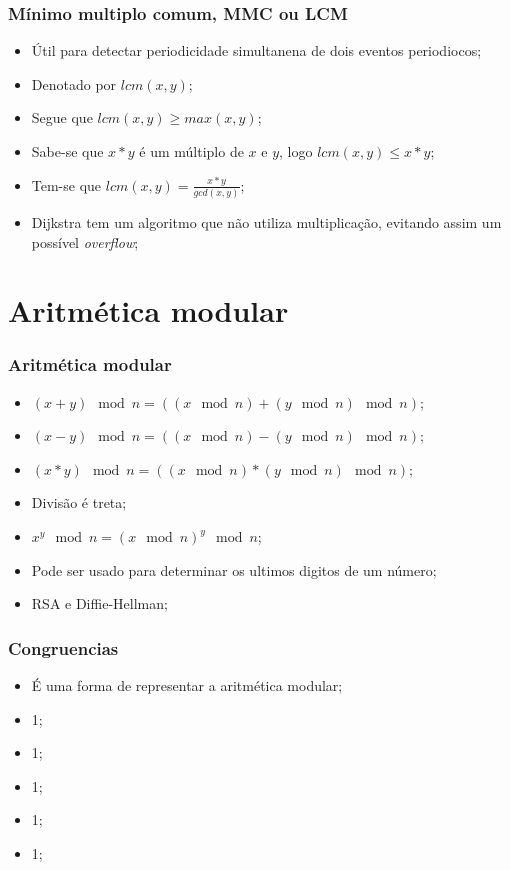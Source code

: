 \documentclass{beamer}
\begin{document}
\begin{frame}
    \frametitle{Mínimo multiplo comum, MMC ou LCM}

    \begin{itemize}
        \item Útil para detectar periodicidade simultanena de dois eventos periodiocos;
        \item Denotado por $lcm(x, y)$;
        \item Segue que $lcm(x, y) \geq max(x, y)$;
        \item Sabe-se que $x*y$ é um múltiplo de $x$ e $y$, logo $lcm(x, y) \leq x*y$;
        \item Tem-se que $lcm(x, y) = \frac{x*y}{gcd(x, y)}$;
        \item Dijkstra tem um algoritmo que não utiliza multiplicação, evitando assim um possível \textit{overflow};
    \end{itemize}
\end{frame}

\section{Aritmética modular}
\begin{frame}
    \frametitle{Aritmética modular}

    \begin{itemize}
        \item $(x + y) \mod n = ((x \mod n) + (y \mod n) \mod n)$;
        \item $(x - y) \mod n = ((x \mod n) - (y \mod n) \mod n)$;
        \item $(x * y) \mod n = ((x \mod n) * (y \mod n) \mod n)$;
        \item Divisão é treta;
        \item $x^y \mod n = (x \mod n)^y \mod n$;
        \item Pode ser usado para determinar os ultimos digitos de um número;
        \item RSA e Diffie-Hellman;
    \end{itemize}
\end{frame}

\begin{frame}
    \frametitle{Congruencias}

    \begin{itemize}
        \item É uma forma de representar a aritmética modular;
        \item 1;
        \item 1;
        \item 1;
        \item 1;
        \item 1;
    \end{itemize}
\end{frame}
\end{document}
